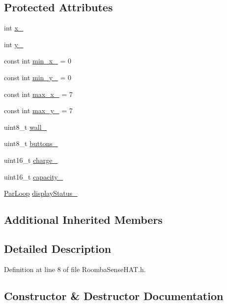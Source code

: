 \subsection*{Protected Attributes}
\begin{DoxyCompactItemize}
\item 
int \hyperlink{class_roomba_sense_h_a_t_a582d0e9fad099c1f7e0ba6a22567676e}{x\+\_\+}
\item 
int \hyperlink{class_roomba_sense_h_a_t_a3732a5d17f708fd18959beb0a4123d25}{y\+\_\+}
\item 
const int \hyperlink{class_roomba_sense_h_a_t_ae39e221ca1b6f9045a77d7befd66afe5}{min\+\_\+x\+\_\+} = 0
\item 
const int \hyperlink{class_roomba_sense_h_a_t_a121e53dc84befcf387724db98aaacf67}{min\+\_\+y\+\_\+} = 0
\item 
const int \hyperlink{class_roomba_sense_h_a_t_a0e74b98418deef0045f13ec563839aaa}{max\+\_\+x\+\_\+} = 7
\item 
const int \hyperlink{class_roomba_sense_h_a_t_ac32eb5edac9e6863af30618d5c3201e7}{max\+\_\+y\+\_\+} = 7
\item 
uint8\+\_\+t \hyperlink{class_roomba_sense_h_a_t_a51d95cef9e8394e0d2a8585daf83fc16}{wall\+\_\+}
\item 
uint8\+\_\+t \hyperlink{class_roomba_sense_h_a_t_a991284bb1f848638f47db5a823b87ef1}{buttons\+\_\+}
\item 
uint16\+\_\+t \hyperlink{class_roomba_sense_h_a_t_a7a382afdb36d1d297ca1ebc7f984db4f}{charge\+\_\+}
\item 
uint16\+\_\+t \hyperlink{class_roomba_sense_h_a_t_a2ba6d89c04f016428a23d85deb3de442}{capacity\+\_\+}
\item 
\hyperlink{class_par_loop}{Par\+Loop} \hyperlink{class_roomba_sense_h_a_t_acae6b7d45762e2159a100f78ac2250ce}{display\+Status\+\_\+}
\end{DoxyCompactItemize}
\subsection*{Additional Inherited Members}


\subsection{Detailed Description}


Definition at line 8 of file Roomba\+Sense\+H\+A\+T.\+h.



\subsection{Constructor \& Destructor Documentation}
